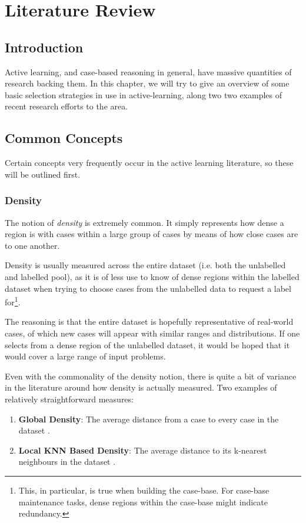 \documentclass[a4paper,11pt]{report}
\begin{document}
\chapter{Literature Review\label{cha:litreview}}
\section{Introduction}
Active learning, and case-based reasoning in general, have massive quantities of research backing them. In this chapter, we will try to give an overview of some basic selection strategies in use in active-learning, along two two examples of recent research efforts to the area.

\section{Common Concepts}
Certain concepts very frequently occur in the active learning literature, so these will be outlined first.

\subsection{Density}
The notion of \emph{density} is extremely common. It simply represents how dense a region is with cases within a large group of cases by means of how close cases are to one another.

Density is usually measured across the entire dataset (i.e. both the unlabelled and labelled pool), as it is of less use to know of dense regions within the labelled dataset when trying to choose cases from the unlabelled data to request a label for\footnote{This, in particular, is true when building the case-base. For case-base maintenance tasks, dense regions within the case-base might indicate redundancy.}. 

The reasoning is that the entire dataset is hopefully representative of real-world cases, of which new cases will appear with similar ranges and distributions. If one selects from a dense region of the unlabelled dataset, it would be hoped that it would cover a large range of input problems.

\begin{samepage}
Even with the commonality of the density notion, there is quite a bit of variance in the literature around how density is actually measured. Two examples of relatively straightforward measures:
\begin{enumerate}
	\item \textbf{Global Density}: The average distance from a case to every case in the dataset \citep{Xu2007}.
	\item \textbf{Local KNN Based Density}: The average distance to its k-nearest neighbours in the dataset \citep{Zhu2008}.
\end{enumerate}
\end{samepage}
\end{document}
